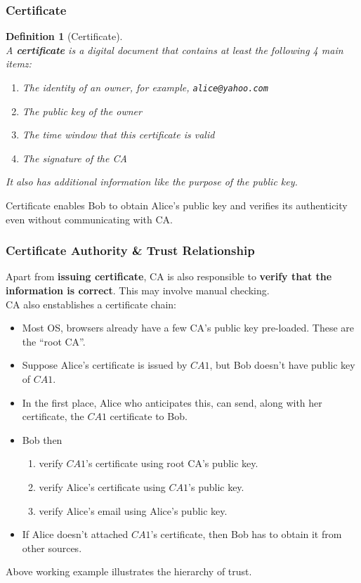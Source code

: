 \documentclass[12pt]{article}
\newtheorem{definition}{Definition}[section]
\theoremstyle{definition}
\begin{document}
\subsubsection{Certificate}
\begin{definition}[Certificate]
\hfill\\\normalfont A \textbf{certificate} is a digital document that contains at least the following 4 main itemz:
\begin{enumerate}
  \item The identity of an owner, for example, \texttt{alice@yahoo.com}
  \item The public key of the owner
  \item The time window that this certificate is valid
  \item The signature of the CA
\end{enumerate}
It also has additional information like the purpose of the public key.
\end{definition}
Certificate enables Bob to obtain Alice's public key and verifies its authenticity even without communicating with CA.
\subsubsection{Certificate Authority \& Trust Relationship}
Apart from \textbf{issuing certificate}, CA is also responsible to \textbf{verify that the information is correct}. This may involve manual checking.\\

CA also enstablishes a certificate chain:
\begin{itemize}
\item Most OS, browsers already have a few CA's public key pre-loaded. These are the ``root CA''.
\item Suppose Alice's certificate is issued by $CA1$, but Bob doesn't have public key of $CA1$.
\item In the first place, Alice who anticipates this, can send, along with her certificate, the $CA1$ certificate to Bob.
\item Bob then
\begin{enumerate}
\item verify $CA1$'s certificate using root CA's public key.
\item verify Alice's certificate using $CA1$'s public key.
\item verify Alice's email using Alice's public key.
\end{enumerate}
\item If Alice doesn’t attached $CA1$'s certificate, then Bob has to obtain it from other sources.
\end{itemize} 
Above working example illustrates the hierarchy of trust.
\end{document}
